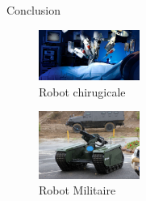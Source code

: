 \documentclass{beamer}
\begin{document}
\begin{frame}{Conclusion}
    \begin{figure}
        \centering
        \includegraphics[width=125]{img/chirg.png}
        \caption{Robot chirugicale}
        \label{fig:my_label}
    \end{figure}
    \begin{figure}
        \centering
        \includegraphics[width=125]{img/militaire.png}
        \caption{Robot Militaire} 
        \label{fig:my_label}
    \end{figure}
\end{frame}
\end{document}
